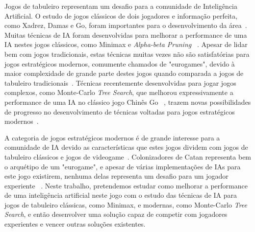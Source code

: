 Jogos de tabuleiro representam um desafio para a comunidade de Inteligência Artificial. O estudo de jogos clássicos de dois jogadores e informação perfeita, como Xadrez, Damas e Go, foram importantes para o desenvolvimento da área~\cite{MONTECARLOCATAN01}. Muitas técnicas de IA foram desenvolvidas para melhorar a performance de uma IA nestes jogos clássicos, como Minimax e \textit{Alpha-beta Pruning} ~\cite{MINIAXCHESS}. Apesar de lidar bem com jogos tradicionais, estas técnicas muitas vezes não são satisfatórias para jogos estratégicos modernos, comumente chamados de "eurogames", devido à maior complexidade de grande parte destes jogos quando comparada a jogos de tabuleiro tradicionais~\cite{MONTECARLOCATAN01}. Técnicas recentemente desenvolvidas para jogar jogos complexos, como Monte-Carlo \textit{Tree Search}, que melhorou expressivamente a performance de uma IA no clássico jogo Chinês Go ~\cite{MONTECARLOGO}, trazem novas possibilidades de progresso no desenvolvimento de técnicas voltadas para jogos estratégicos modernos~\cite{MONTECARLOFRAMEWORK}.

A categoria de jogos estratégicos modernos é de grande interesse para a comunidade de IA devido as características que estes jogos dividem com jogos de tabuleiro clássicos e jogos de videogame~\cite{MONTECARLOFRAMEWORK}. Colonizadores de Catan representa bem o arquétipo de um "eurogame", e apesar de várias implementações de IAs para este jogo existirem, nenhuma delas representa um desafio para um jogador experiente ~\cite{MONTECARLOFRAMEWORK}. Neste trabalho, pretendemos estudar como melhorar a performance de uma inteligência artificial neste jogo com o estudo das técnicas de IA para jogos de tabuleiro clássicas, como Minimax, e modernas, como Monte-Carlo \textit{Tree Search}, e então desenvolver uma solução capaz de competir com jogadores experientes e vencer outras soluções existentes.




